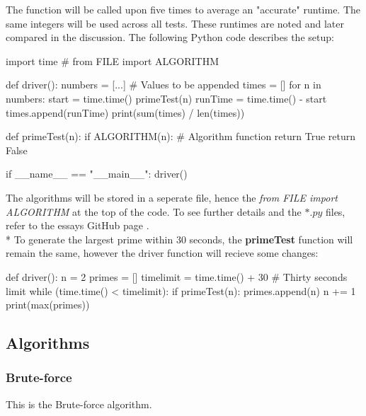 \documentclass[main.tex]{subfiles}
\begin{document}
\vspace{10mm}

The function will be called upon five times to average an "accurate" runtime. The same integers will be used across all tests. These runtimes are noted and later compared in the discussion. The following Python code describes the setup:

\begin{python}
    import time
    # from FILE import ALGORITHM

    def driver():
        numbers = [...] # Values to be appended
        times = []
        for n in numbers:
            start = time.time()
            primeTest(n)
            runTime = time.time() - start
            times.append(runTime)
        print(sum(times) / len(times))

    def primeTest(n):
        if ALGORITHM(n): # Algorithm function
            return True
        return False

    if __name__ == "__main__":
        driver()
\end{python}

The algorithms will be stored in a seperate file, hence the \textit{from FILE import ALGORITHM} at the top of the code. To see further details and the $*.py$ files, refer to the essays GitHub page \cite{github}.
\newline
\\*
To generate the largest prime within $30$ seconds, the \textbf{primeTest} function will remain the same, however the driver function will recieve some changes:

\begin{python}
    def driver():
        n = 2
        primes = []
        timelimit = time.time() + 30  # Thirty seconds limit
        while (time.time() < timelimit):
            if primeTest(n):
                primes.append(n)
            n += 1
        print(max(primes))
\end{python}



\subsection{Algorithms}

\subsubsection{Brute-force}

This is the Brute-force algorithm.
\end{document}

